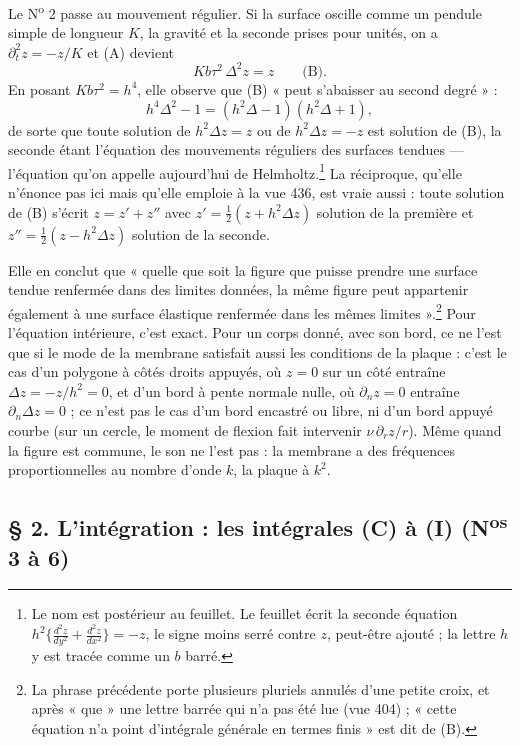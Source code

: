 \documentclass[11pt,a4paper]{article}
\begin{document}
Le N\textsuperscript{o} 2 passe au mouvement régulier. Si la surface oscille comme un
pendule simple de longueur $K$, la gravité et la seconde prises pour unités, on a
$\partial_t^2 z = -z/K$ et (A) devient
\[
K b\tau^2\,\Delta^2 z = z \qquad \text{(B)}.
\]
En posant $K b\tau^2 = h^4$, elle observe que (B) « peut s'abaisser au second degré » :
\[
h^4\Delta^2 - 1 = (h^2\Delta - 1)(h^2\Delta + 1),
\]
de sorte que toute solution de $h^2\Delta z = z$ ou de $h^2\Delta z = -z$ est solution de
(B), la seconde étant l'équation des mouvements réguliers des surfaces tendues —
l'équation qu'on appelle aujourd'hui de Helmholtz.\footnote{Le nom est postérieur au
feuillet. Le feuillet écrit la seconde équation $h^2\{\frac{d^2z}{dy^2}+\frac{d^2z}{dx^2}\}=-z$,
le signe moins serré contre $z$, peut-être ajouté ; la lettre $h$ y est tracée comme
un $b$ barré.} La réciproque, qu'elle n'énonce pas ici mais qu'elle emploie à la
vue 436, est vraie aussi : toute solution de (B) s'écrit $z = z' + z''$ avec
$z' = \frac12(z + h^2\Delta z)$ solution de la première et
$z'' = \frac12(z - h^2\Delta z)$ solution de la seconde.

Elle en conclut que « quelle que soit la figure que puisse prendre une surface tendue
renfermée dans des limites données, la même figure peut appartenir également à une
surface élastique renfermée dans les mêmes limites ».\footnote{La phrase précédente
porte plusieurs pluriels annulés d'une petite croix, et après « que » une lettre
barrée qui n'a pas été lue (vue 404) ; « cette équation n'a point d'intégrale générale
en termes finis » est dit de (B).} Pour l'équation intérieure, c'est exact. Pour un
corps donné, avec son bord, ce ne l'est que si le mode de la membrane satisfait aussi
les conditions de la plaque : c'est le cas d'un polygone à côtés droits appuyés, où
$z = 0$ sur un côté entraîne $\Delta z = -z/h^2 = 0$, et d'un bord à pente normale nulle,
où $\partial_n z = 0$ entraîne $\partial_n\Delta z = 0$ ; ce n'est pas le cas d'un bord
encastré ou libre, ni d'un bord appuyé courbe (sur un cercle, le moment de flexion fait
intervenir $\nu\,\partial_r z/r$). Même quand la figure est commune, le son ne l'est
pas : la membrane a des fréquences proportionnelles au nombre d'onde $k$, la plaque à
$k^2$.

\subsection*{§ 2. L'intégration : les intégrales (C) à (I) (N\textsuperscript{os} 3 à 6)}
\end{document}
